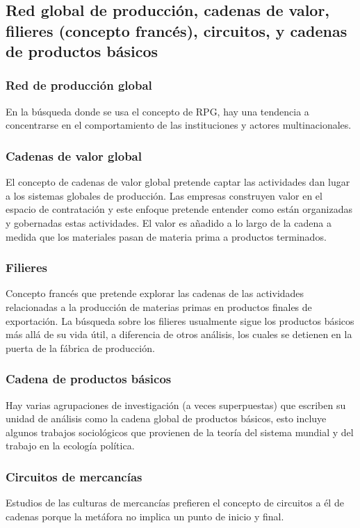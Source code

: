\documentclass{article}
\begin{document}
\subsection{Red global de producción, cadenas de valor, filieres (concepto francés), circuitos, y cadenas de productos básicos}
\subsubsection{Red de producción global}       
En la búsqueda donde se usa el concepto de RPG, hay una tendencia a concentrarse en el comportamiento de las instituciones y actores multinacionales.


\subsubsection{Cadenas de valor global}
 El concepto de cadenas de valor global pretende captar las actividades dan lugar a los sistemas globales de producción. Las empresas construyen valor en el espacio de contratación y este enfoque pretende entender como están organizadas y gobernadas estas actividades. El valor es añadido a lo largo de la cadena a medida que los materiales pasan de materia prima a productos terminados.
\subsubsection{Filieres}
Concepto francés que pretende explorar las cadenas de las actividades relacionadas a la producción de materias primas en productos finales de exportación. La búsqueda sobre los filieres usualmente sigue los productos básicos más allá de su vida útil, a diferencia de otros análisis, los cuales se detienen en la puerta de la fábrica de producción.
\subsubsection{Cadena de productos básicos}
Hay varias agrupaciones de investigación (a veces superpuestas) que escriben su unidad de análisis como la cadena global de productos básicos, esto incluye algunos trabajos sociológicos que provienen de la teoría del sistema mundial y del trabajo en la ecología política.
\subsubsection{Circuitos de mercancías}
Estudios de las culturas de mercancías prefieren el concepto de circuitos a él de cadenas porque la metáfora no implica un punto de inicio y final.
\end{document}
